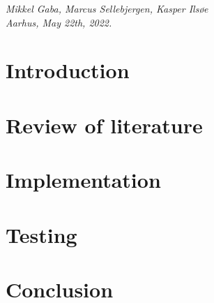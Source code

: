 \documentclass[11pt,openright]{report}
\begin{document}


\vspace{2ex}
\begin{flushright}
  \emph{Mikkel Gaba, Marcus Sellebjergen, Kasper Ils{\o}e}\\
  \emph{Aarhus, May 22th, 2022.}
\end{flushright}

\tableofcontents
\cleardoublepage
{}
\setcounter{secnumdepth}{2}


\chapter{Introduction}
\label{ch:intro}





\chapter{Review of literature}
\label{ch:main1}








\chapter{Implementation}
\label{ch:main2}







\chapter{Testing}
\label{ch:main3}




\chapter{Conclusion}
\label{ch:conclusion}
\end{document}
